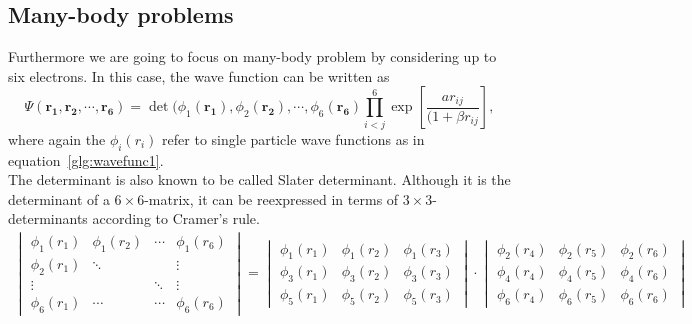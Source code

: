 \subsection{Many-body problems}
Furthermore we are going to focus on many-body problem by considering up to six electrons. In this case, the wave function can be written as
\begin{equation}
\Psi(\mathbf{r_1,r_2,\cdots, r_6}) = \det(\phi_1(\mathbf{r_1}),\phi_2(\mathbf{r_2}),\cdots,\phi_6(\mathbf{r_6}) \prod_{i<j}^6 \exp\left[\frac{a r_{ij}}{(1+\beta r_{ij}}\right],
\end{equation}
where again the $\phi_i(r_i)$ refer to single particle wave functions as in equation~\ref{glg:wavefunc1}.\\
The determinant is also known to be called Slater determinant. Although it is the determinant of a $6\times 6$-matrix, it can be reexpressed in terms of $3\times 3$-determinants according to Cramer's rule.
\begin{align}
\begin{vmatrix}
\phi_1(r_1) & \phi_1(r_2) & \cdots & \phi_1(r_6)\\
\phi_2(r_1) & \ddots & &\vdots \\
\vdots & & \ddots& \vdots\\
\phi_6(r_1) & \cdots & \cdots & \phi_6(r_6)
\end{vmatrix}
=
\begin{vmatrix}
\phi_1(r_1)& \phi_1(r_2)& \phi_1(r_3)\\
\phi_3(r_1)& \phi_3(r_2)& \phi_3(r_3)\\
\phi_5(r_1)& \phi_5(r_2)& \phi_5(r_3)
\end{vmatrix}
\cdot
\begin{vmatrix}
\phi_2(r_4)& \phi_2(r_5)& \phi_2(r_6)\\
\phi_4(r_4)& \phi_4(r_5)& \phi_4(r_6)\\
\phi_6(r_4)& \phi_6(r_5)& \phi_6(r_6)
\end{vmatrix}
\end{align}